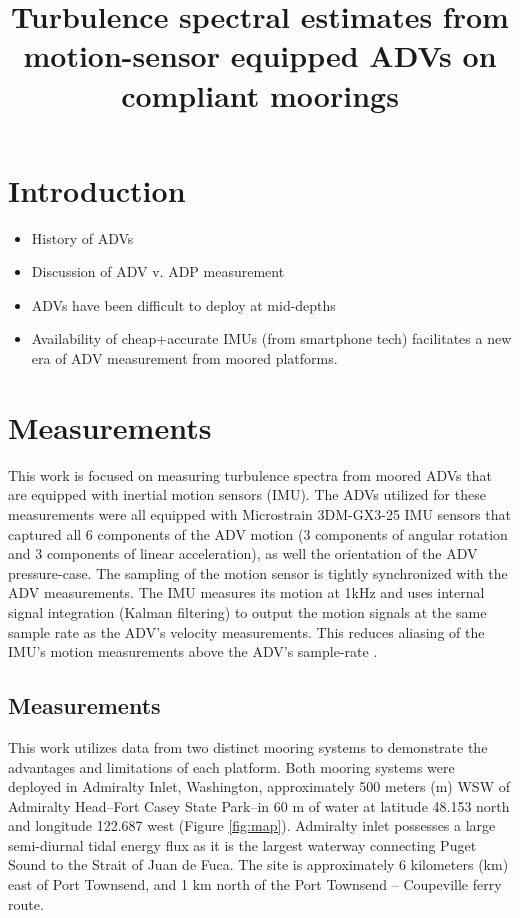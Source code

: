 \documentclass[twocol]{ametsoc}
\title{Turbulence spectral estimates from motion-sensor equipped ADVs on compliant moorings}
\affiliation{}
\begin{document}
\maketitle


\section{Introduction}

\begin{itemize}
\item History of ADVs
\item Discussion of ADV v. ADP measurement
\item ADVs have been difficult to deploy at mid-depths
\item Availability of cheap+accurate IMUs (from smartphone tech) facilitates a new era of ADV measurement from moored platforms.
\end{itemize}

\section{Measurements}
\label{sec:meas}

This work is focused on measuring turbulence spectra from moored ADVs that are equipped with inertial motion sensors (IMU). The ADVs utilized for these measurements were all equipped with Microstrain 3DM-GX3-25 IMU sensors that captured all 6 components of the ADV motion (3 components of angular rotation and 3 components of linear acceleration), as well the orientation of the ADV pressure-case. The sampling of the motion sensor is tightly synchronized with the ADV measurements. The IMU measures its motion at 1kHz and uses internal signal integration (Kalman filtering) to output the motion signals at the same sample rate as the ADV's velocity measurements. This reduces aliasing of the IMU's motion measurements above the ADV's sample-rate \cite{3DM-GX3_coning_sculling}.

\subsection{Measurements}

This work utilizes data from two distinct mooring systems to demonstrate the advantages and limitations of each platform. Both mooring systems were deployed in Admiralty Inlet, Washington, approximately 500 meters (m) WSW of Admiralty Head--Fort Casey State Park--in 60 m of water at latitude 48.153 north and longitude 122.687 west (Figure \ref{fig:map}). Admiralty inlet possesses a large semi-diurnal tidal energy flux as it is the largest waterway connecting Puget Sound to the Strait of Juan de Fuca. The site is approximately 6 kilometers (km) east of Port Townsend, and 1 km north of the Port Townsend -- Coupeville ferry route.
\end{document}
